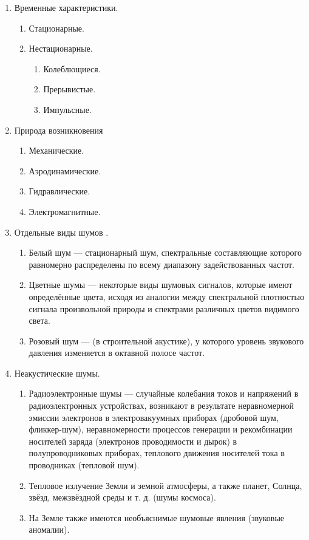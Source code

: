 \begin{enumerate}
	\item Временные характеристики.
		\begin{enumerate}
			\item Стационарные.
			\item Нестационарные.
				\begin{enumerate}
					\item Колеблющиеся.
					\item Прерывистые.
					\item Импульсные.				
				\end{enumerate}
		
		\end{enumerate}
	
	\item Природа возникновения 
		\begin{enumerate}
			\item Механические.
			\item Аэродинамические.
			\item Гидравлические.
			\item Электромагнитные. 				
		\end{enumerate}
	
	\newpage
	
	\item Отдельные виды шумов \cite{noise2}.
		\begin{enumerate}
			\item Белый шум --- стационарный шум, спектральные составляющие которого равномерно распределены по всему диапазону задействованных частот.
			\item Цветные шумы --- некоторые виды шумовых сигналов, которые имеют определённые цвета, исходя из аналогии между спектральной плотностью сигнала произвольной природы и спектрами различных цветов видимого света.
			\item Розовый шум --- (в строительной акустике), у которого уровень звукового давления изменяется в октавной полосе частот.				
		\end{enumerate}	

	\item Неакустические шумы.
		\begin{enumerate}
			\item Радиоэлектронные шумы --- случайные колебания токов и напряжений в радиоэлектронных устройствах, возникают в результате неравномерной эмиссии электронов в электровакуумных приборах (дробовой шум, фликкер-шум), неравномерности процессов генерации и рекомбинации носителей заряда (электронов проводимости и дырок) в полупроводниковых приборах, теплового движения носителей тока в проводниках (тепловой шум).
			\item Тепловое излучение Земли и земной атмосферы, а также планет, Солнца, звёзд, межзвёздной среды и т. д. (шумы космоса).
			\item На Земле также имеются необъяснимые шумовые явления (звуковые аномалии).
		\end{enumerate}
\end{enumerate}

